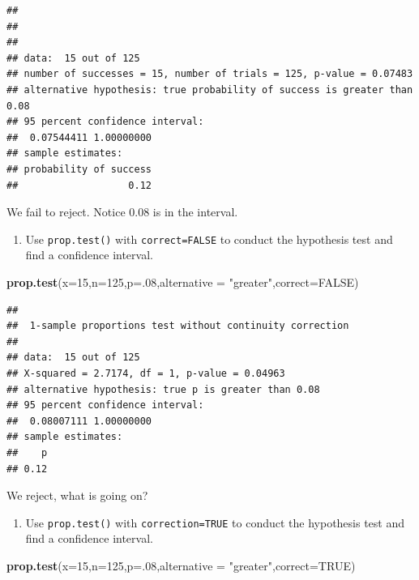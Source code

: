 \documentclass[
]{book}
\newenvironment{Shaded}{\begin{snugshade}}{\end{snugshade}}
\newcommand{\DataTypeTok}[1]{\textcolor[rgb]{0.13,0.29,0.53}{#1}}
\newcommand{\DecValTok}[1]{\textcolor[rgb]{0.00,0.00,0.81}{#1}}
\newcommand{\KeywordTok}[1]{\textcolor[rgb]{0.13,0.29,0.53}{\textbf{#1}}}
\newcommand{\NormalTok}[1]{#1}
\newcommand{\OtherTok}[1]{\textcolor[rgb]{0.56,0.35,0.01}{#1}}
\newcommand{\StringTok}[1]{\textcolor[rgb]{0.31,0.60,0.02}{#1}}
\providecommand{\tightlist}{%
  \setlength{\itemsep}{0pt}\setlength{\parskip}{0pt}}
\begin{document}
\begin{verbatim}
## 
## 
## 
## data:  15 out of 125
## number of successes = 15, number of trials = 125, p-value = 0.07483
## alternative hypothesis: true probability of success is greater than 0.08
## 95 percent confidence interval:
##  0.07544411 1.00000000
## sample estimates:
## probability of success 
##                   0.12
\end{verbatim}

We fail to reject. Notice 0.08 is in the interval.

\begin{enumerate}
\def\labelenumi{\alph{enumi}.}
\setcounter{enumi}{1}
\tightlist
\item
  Use \texttt{prop.test()} with \texttt{correct=FALSE} to conduct the hypothesis test and find a confidence interval.
\end{enumerate}

\begin{Shaded}
\begin{Highlighting}[]
\KeywordTok{prop.test}\NormalTok{(}\DataTypeTok{x=}\DecValTok{15}\NormalTok{,}\DataTypeTok{n=}\DecValTok{125}\NormalTok{,}\DataTypeTok{p=}\NormalTok{.}\DecValTok{08}\NormalTok{,}\DataTypeTok{alternative =} \StringTok{"greater"}\NormalTok{,}\DataTypeTok{correct=}\OtherTok{FALSE}\NormalTok{)}
\end{Highlighting}
\end{Shaded}

\begin{verbatim}
## 
##  1-sample proportions test without continuity correction
## 
## data:  15 out of 125
## X-squared = 2.7174, df = 1, p-value = 0.04963
## alternative hypothesis: true p is greater than 0.08
## 95 percent confidence interval:
##  0.08007111 1.00000000
## sample estimates:
##    p 
## 0.12
\end{verbatim}

We reject, what is going on?

\begin{enumerate}
\def\labelenumi{\alph{enumi}.}
\setcounter{enumi}{2}
\tightlist
\item
  Use \texttt{prop.test()} with \texttt{correction=TRUE} to conduct the hypothesis test and find a confidence interval.
\end{enumerate}

\begin{Shaded}
\begin{Highlighting}[]
\KeywordTok{prop.test}\NormalTok{(}\DataTypeTok{x=}\DecValTok{15}\NormalTok{,}\DataTypeTok{n=}\DecValTok{125}\NormalTok{,}\DataTypeTok{p=}\NormalTok{.}\DecValTok{08}\NormalTok{,}\DataTypeTok{alternative =} \StringTok{"greater"}\NormalTok{,}\DataTypeTok{correct=}\OtherTok{TRUE}\NormalTok{)}
\end{Highlighting}
\end{Shaded}
\end{document}
